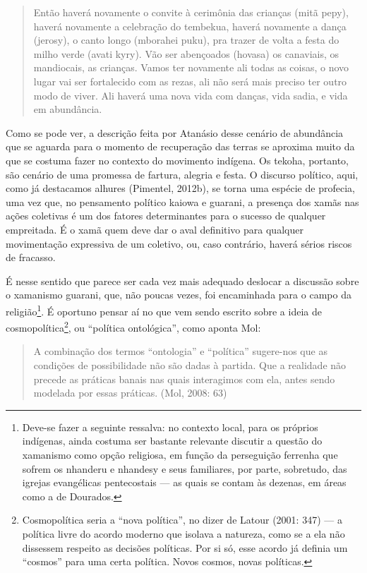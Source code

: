 \begin{quotation}
Então haverá novamente o convite à cerimônia das crianças (mitã pepy),
haverá novamente a celebração do tembekua, haverá novamente a dança
(jerosy), o canto longo (mborahei puku), pra trazer de volta a festa do
milho verde (avati kyry). Vão ser abençoados (hovasa) os canaviais, os
mandiocais, as crianças. Vamos ter novamente ali todas as coisas, o
novo lugar vai ser fortalecido com as rezas, ali não será mais preciso
ter outro modo de viver. Ali haverá uma nova vida com danças, vida
sadia, e vida em abundância.
\end{quotation}

Como se pode ver, a descrição feita por Atanásio desse cenário de
abundância que se aguarda para o momento de recuperação das terras se
aproxima muito da que se costuma fazer no contexto do movimento
indígena. Os tekoha, portanto, são cenário de uma promessa de fartura,
alegria e festa. O discurso político, aqui, como já destacamos alhures
(Pimentel, 2012b), se torna uma espécie de profecia, uma vez que, no
pensamento político kaiowa e guarani, a presença dos xamãs nas ações
coletivas é um dos fatores determinantes para o sucesso de qualquer
empreitada. É o xamã quem deve dar o aval definitivo para qualquer
movimentação expressiva de um coletivo, ou, caso contrário, haverá
sérios riscos de fracasso. 

É nesse sentido que parece ser cada vez mais adequado deslocar a
discussão sobre o xamanismo guarani, que, não poucas vezes, foi
encaminhada para o campo da religião\footnote{Deve-se fazer a seguinte
ressalva: no contexto local, para os próprios indígenas, ainda costuma
ser bastante relevante discutir a questão do xamanismo como opção
religiosa, em função da perseguição ferrenha que sofrem os nhanderu e
nhandesy e seus familiares, por parte, sobretudo, das igrejas
evangélicas pentecostais — as quais se contam às dezenas, em áreas como
a de Dourados.}. É oportuno pensar aí no que vem sendo escrito sobre
a ideia de cosmopolítica\footnote{Cosmopolítica seria a ``nova
política'', no dizer de Latour (2001: 347) — a política livre do acordo
moderno que isolava a natureza, como se a ela não dissessem respeito as
decisões políticas. Por si só, esse acordo já definia um ``cosmos'' para
uma certa política. Novos cosmos, novas políticas.}, ou ``política
ontológica'', como aponta Mol: 

\begin{quotation}
A combinação dos termos ``ontologia'' e ``política'' sugere-nos que as
condições de possibilidade não são dadas à partida. Que a realidade não
precede as práticas banais nas quais interagimos com ela, antes sendo
modelada por essas práticas. (Mol, 2008: 63)
\end{quotation}

